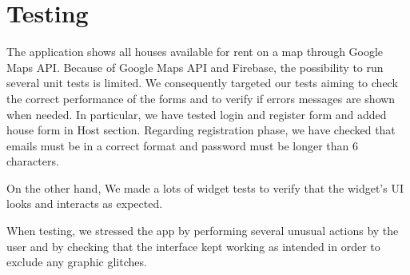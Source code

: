 \chapter{Testing}
The application shows all houses available for rent on a map through Google Maps API. Because of Google Maps API and Firebase, the possibility to run several unit tests is limited.  We consequently targeted our tests aiming to check the correct performance of the forms and to verify if errors messages are shown when needed.  In particular, we have tested login and register form and added house form in Host section. Regarding registration phase, we have checked that emails must be in a correct format and password must be longer than 6 characters.

On the other hand, We made a lots of widget tests to verify that the widget’s UI looks and interacts as expected. 

When testing, we stressed the app by performing several unusual actions by the user and by checking that the interface kept working as intended in order to exclude any graphic glitches.